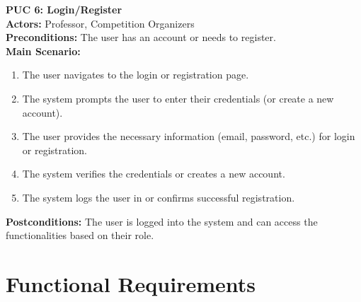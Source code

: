 \documentclass[12pt]{article}
\begin{document}
\textbf{PUC 6: Login/Register}\\
\textbf{Actors:} Professor, Competition Organizers\\
\textbf{Preconditions:} The user has an account or needs to register.\\
\textbf{Main Scenario:}
\begin{enumerate}
    \item The user navigates to the login or registration page.
    \item The system prompts the user to enter their credentials (or create a new account).
    \item The user provides the necessary information (email, password, etc.) for login or registration.
    \item The system verifies the credentials or creates a new account.
    \item The system logs the user in or confirms successful registration.
\end{enumerate}
\textbf{Postconditions:} The user is logged into the system and can access the functionalities based on their role.

\section{Functional Requirements}
\end{document}
